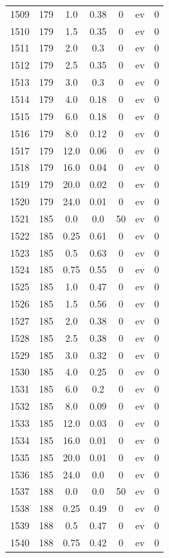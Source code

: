 \documentclass[12pt,a4paper]{article}
\begin{document}
\begin{tabular}{r|cccccc}
	1509 & 179 & 1.0 & 0.38 & 0 & ev & 0 \\
	1510 & 179 & 1.5 & 0.35 & 0 & ev & 0 \\
	1511 & 179 & 2.0 & 0.3 & 0 & ev & 0 \\
	1512 & 179 & 2.5 & 0.35 & 0 & ev & 0 \\
	1513 & 179 & 3.0 & 0.3 & 0 & ev & 0 \\
	1514 & 179 & 4.0 & 0.18 & 0 & ev & 0 \\
	1515 & 179 & 6.0 & 0.18 & 0 & ev & 0 \\
	1516 & 179 & 8.0 & 0.12 & 0 & ev & 0 \\
	1517 & 179 & 12.0 & 0.06 & 0 & ev & 0 \\
	1518 & 179 & 16.0 & 0.04 & 0 & ev & 0 \\
	1519 & 179 & 20.0 & 0.02 & 0 & ev & 0 \\
	1520 & 179 & 24.0 & 0.01 & 0 & ev & 0 \\
	1521 & 185 & 0.0 & 0.0 & 50 & ev & 0 \\
	1522 & 185 & 0.25 & 0.61 & 0 & ev & 0 \\
	1523 & 185 & 0.5 & 0.63 & 0 & ev & 0 \\
	1524 & 185 & 0.75 & 0.55 & 0 & ev & 0 \\
	1525 & 185 & 1.0 & 0.47 & 0 & ev & 0 \\
	1526 & 185 & 1.5 & 0.56 & 0 & ev & 0 \\
	1527 & 185 & 2.0 & 0.38 & 0 & ev & 0 \\
	1528 & 185 & 2.5 & 0.38 & 0 & ev & 0 \\
	1529 & 185 & 3.0 & 0.32 & 0 & ev & 0 \\
	1530 & 185 & 4.0 & 0.25 & 0 & ev & 0 \\
	1531 & 185 & 6.0 & 0.2 & 0 & ev & 0 \\
	1532 & 185 & 8.0 & 0.09 & 0 & ev & 0 \\
	1533 & 185 & 12.0 & 0.03 & 0 & ev & 0 \\
	1534 & 185 & 16.0 & 0.01 & 0 & ev & 0 \\
	1535 & 185 & 20.0 & 0.01 & 0 & ev & 0 \\
	1536 & 185 & 24.0 & 0.0 & 0 & ev & 0 \\
	1537 & 188 & 0.0 & 0.0 & 50 & ev & 0 \\
	1538 & 188 & 0.25 & 0.49 & 0 & ev & 0 \\
	1539 & 188 & 0.5 & 0.47 & 0 & ev & 0 \\
	1540 & 188 & 0.75 & 0.42 & 0 & ev & 0 \\

\end{tabular}
\end{document}
